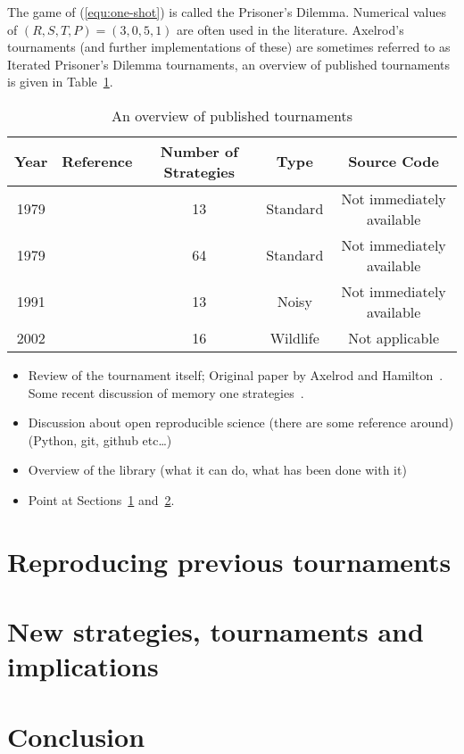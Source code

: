 \documentclass{article}
\begin{document}
The game of (\ref{equ:one-shot}) is called the Prisoner's Dilemma. Numerical
values of \((R,S,T,P)=(3,0,5,1)\) are often used in the literature. Axelrod's
tournaments (and further implementations of these) are sometimes referred to as
Iterated Prisoner's Dilemma tournaments, an overview of published tournaments is
given in Table~\ref{tab:tournaments}.

\begin{table}[!hbtp]
    \begin{center}
        \begin{tabular}{ccccc}
            \toprule
            Year     & Reference           & Number of Strategies & Type     & Source Code\\
            \midrule
            1979     & \cite{Axelrod1980a} & 13                   & Standard & Not immediately available\\
            1979     & \cite{Axelrod1980b} & 64                   & Standard & Not immediately available\\
            1991     & \cite{Bendor1991}   & 13                   & Noisy    & Not immediately available\\
            2002     & \cite{Stephens2002} & 16                   & Wildlife & Not applicable\\
            \bottomrule
        \end{tabular}
    \end{center}
    \caption{An overview of published tournaments}\label{tab:tournaments}
\end{table}

\begin{itemize}
\item Review of the tournament itself;
      Original paper by Axelrod and Hamilton~\cite{1981-Axelrod-Hamilton}.
      Some recent discussion of memory one strategies~\cite{press2012iterated, stewart2012extortion}.

\item Discussion about open reproducible science (there are some reference
      around) (Python, git, github etc\dots)
\item Overview of the library (what it can do, what has been done with it)
\item Point at Sections~\ref{sec:reproducing-previous-tournaments}
      and~\ref{sec:new-strategies-and-implications}.
\end{itemize}

\section{Reproducing previous tournaments}\label{sec:reproducing-previous-tournaments}

\section{New strategies, tournaments and implications}\label{sec:new-strategies-and-implications}

\section{Conclusion}\label{sec:conclusion}

\printbibliography
\end{document}
